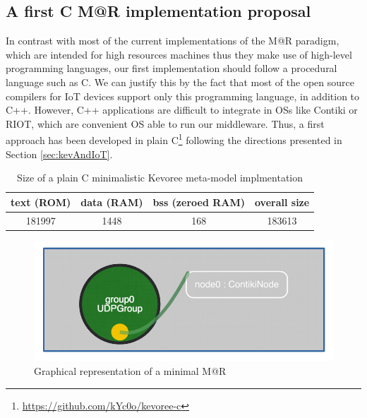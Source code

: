 \subsection{A first C M@R implementation proposal}
\label{subsec:MARImpl}
In contrast with most of the current implementations of the M@R paradigm, which are intended for high resources machines thus they make use of high-level programming languages, our first implementation should follow a procedural language such as C.
We can justify this by the fact that most of the open source compilers for IoT devices support only this programming language, in addition to C++.
However, C++ applications are difficult to integrate in OSs like Contiki or RIOT, which are convenient OS able to run our middleware.
Thus, a first approach has been developed in plain C\footnote{\url{https://github.com/kYc0o/kevoree-c}} following the directions presented in Section \ref{sec:kevAndIoT}.

\begin{table}[]
	\centering
	\caption{Size of a plain C minimalistic Kevoree meta-model implmentation}
	\label{tab:kevoreeC}
	\begin{tabular}{|c|c|c|c|}
		\hline
		\textbf{text (ROM)}   & \textbf{data (RAM)} & \textbf{bss (zeroed RAM)} & \textbf{overall size} \\ \hline
		181997 & 1448 & 168 & 183613 \\ \hline
	\end{tabular}
\end{table}

\begin{figure}[]
	\centering
	\includegraphics[width=0.55\columnwidth]{chapters/modelsAtRuntimeContiki.images/MAR_example.pdf}
	\caption{Graphical representation of a minimal M@R}
	\label{fig:1stModelC}
\end{figure}

